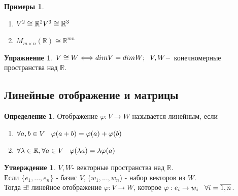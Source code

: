 \documentclass[a4paper, 12pt]{article}
\newcommand{\R}{\mathbb R}
\renewcommand{\phi}{\varphi}
\newcommand\tab[1][.5cm]{\hspace*{#1}}
\theoremstyle{definition}
\newtheorem*{definition}{Определение}
\newtheorem*{subtheorem}{Утверждение}
\newtheorem*{example}{Примеры}
\newtheorem*{lalala}{Упражнение}
\begin{document}
  \begin{example}\end{example}
  \begin{enumerate}
    \item $V^2 \cong \R^2 \\ V^3 \cong \R^3$ 
    \item $M_{m \times n}(\R) \cong \R^{mn}$
  \end{enumerate}
  \begin{lalala}
    $V \cong W \Longleftrightarrow dimV = dimW; \tab[0.2cm] V,W - $ конечномерные пространства над $\R$.  
  \end{lalala}
  \subsection{Линейные отображение и матрицы}
  \begin{definition}
    Отображение $\phi: V \to W$ называется линейным, если
    \begin{enumerate}
      \item $\forall a,b \in V \tab[0.3cm] \phi(a+b) = \phi(a) + \phi(b)$
      \item $\forall \lambda \in \R, \forall a \in V \tab[0.3cm] \phi(\lambda a) = \lambda \phi(a)$  
    \end{enumerate}
    
  \end{definition} 
  \begin{subtheorem}
    $V,W$- векторные пространства над $\R$. \\
      Если $\{e_1,...,e_n\}$ - базис $V$, ($w_1,...,w_n$) - набор векторов из $W$. \\Тогда $\exists$! линейное отображение $\phi: V \to W$, которое $\phi: e_i \to w_i \tab[0.3cm]\forall i = \overline{1,n}$.
  \end{subtheorem} 
\end{document}
